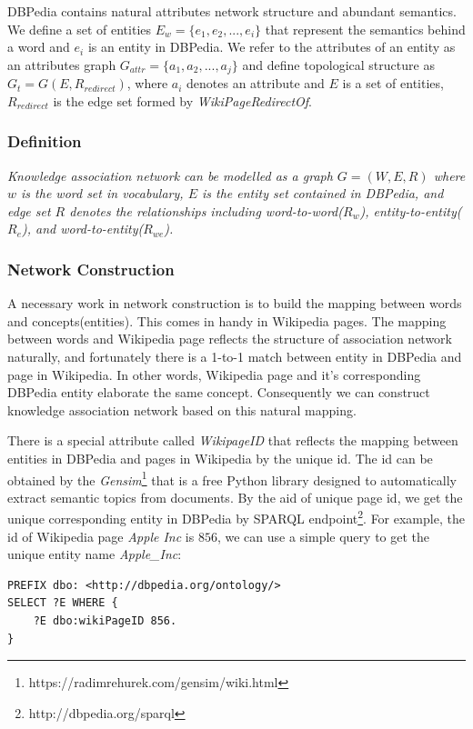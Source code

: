 DBPedia contains natural attributes network structure and abundant semantics.
We define a set of entities $\mathit{E_w=\{e_1, e_2, ..., e_i\}}$ that represent the semantics behind a word and $e_i$ is an entity in DBPedia.
We refer to the attributes of an entity as an attributes graph $\mathit{G_{attr}=\{a_1, a_2, ..., a_j\}}$ and define topological structure as 
$\mathit{G_{t}=G(E, R_{redirect})}$, where $a_i$ denotes an attribute and $E$ is a set of entities, $R_{redirect}$ is the edge set formed by
\emph{WikiPageRedirectOf}.

\subsubsection{Definition}
\emph{Knowledge association network can be modelled as a graph $G=(W, E, R)$ where $w$ is the word set in vocabulary, $E$ is the entity set contained in DBPedia,
and edge set $R$ denotes the relationships including word-to-word($R_{w}$), entity-to-entity($R_{e}$), and word-to-entity($R_{we}$).}

\subsubsection{Network Construction}
A necessary work in network construction is to build the mapping between words and concepts(entities). 
This comes in handy in Wikipedia pages. The mapping between words and Wikipedia page reflects 
the structure of association network naturally, and fortunately there is a 1-to-1 match between entity in DBPedia and page in Wikipedia.
In other words, Wikipedia page and it's corresponding DBPedia entity elaborate the same concept.
Consequently we can construct knowledge association network based on this natural mapping.

There is a special attribute called \emph{WikipageID} that reflects the mapping between entities in DBPedia and pages
in Wikipedia by the unique id.
The id can be obtained by the \emph{Gensim}\footnote{https://radimrehurek.com/gensim/wiki.html} that is a free Python
library designed to automatically extract semantic topics from documents. By the aid of unique page id,
we get the unique corresponding entity in DBPedia by SPARQL endpoint\footnote{http://dbpedia.org/sparql}.
For example, the id of Wikipedia page \emph{Apple Inc} is $856$, we can use a simple query to get the unique entity name \emph{Apple\_Inc}:

\begin{lstlisting}[basicstyle=\fontsize{9}{11}\ttfamily]
PREFIX dbo: <http://dbpedia.org/ontology/>
SELECT ?E WHERE {
    ?E dbo:wikiPageID 856.
}
\end{lstlisting}

